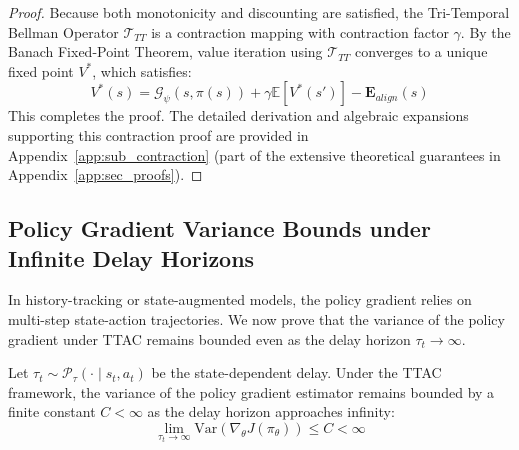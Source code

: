 \documentclass[manuscript, screen, review]{jair}
\begin{document}
\begin{proof}
Because both monotonicity and discounting are satisfied, the Tri-Temporal Bellman Operator $\mathcal{T}_{TT}$ is a contraction mapping with contraction factor $\gamma$. By the Banach Fixed-Point Theorem, value iteration using $\mathcal{T}_{TT}$ converges to a unique fixed point $V^*$, which satisfies:
\begin{equation*}
    V^*(s) = \mathcal{G}_\psi(s, \pi(s)) + \gamma \mathbb{E} [V^*(s')] - \mathbf{E}_{align}(s)
\end{equation*}
This completes the proof. The detailed derivation and algebraic expansions supporting this contraction proof are provided in Appendix~\ref{app:sub_contraction} (part of the extensive theoretical guarantees in Appendix~\ref{app:sec_proofs}).
\end{proof}

\subsection{Policy Gradient Variance Bounds under Infinite Delay Horizons}
In history-tracking or state-augmented models, the policy gradient relies on multi-step state-action trajectories. We now prove that the variance of the policy gradient under TTAC remains bounded even as the delay horizon $\tau_t \to \infty$.

\begin{theorem}
Let $\tau_t \sim \mathcal{P}_\tau(\cdot \mid s_t, a_t)$ be the state-dependent delay. Under the TTAC framework, the variance of the policy gradient estimator remains bounded by a finite constant $C < \infty$ as the delay horizon approaches infinity:
\begin{equation}
    \left. \lim_{\tau_t \to \infty} \text{Var}(\nabla_\theta J(\pi_\theta)) \le C < \infty \right.
\end{equation}
\end{theorem}
\end{document}
